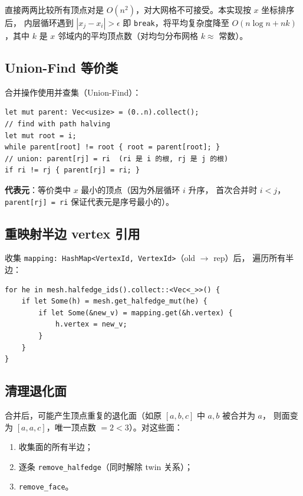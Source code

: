 \documentclass[11pt,a4paper]{article}
\begin{document}
直接两两比较所有顶点对是 $O(n^2)$，对大网格不可接受。本实现按 $x$ 坐标排序后，
内层循环遇到 $|x_j - x_i| > \epsilon$ 即 \texttt{break}，将平均复杂度降至
$O(n \log n + nk)$，其中 $k$ 是 $x$ 邻域内的平均顶点数（对均匀分布网格 $k \approx$ 常数）。

\subsection{Union-Find 等价类}

合并操作使用并查集（Union-Find）：

\begin{lstlisting}
let mut parent: Vec<usize> = (0..n).collect();
// find with path halving
let mut root = i;
while parent[root] != root { root = parent[root]; }
// union: parent[rj] = ri  (ri 是 i 的根, rj 是 j 的根)
if ri != rj { parent[rj] = ri; }
\end{lstlisting}

\textbf{代表元}：等价类中 $x$ 最小的顶点（因为外层循环 $i$ 升序，
首次合并时 $i < j$，\texttt{parent[rj] = ri} 保证代表元是序号最小的）。

\subsection{重映射半边 vertex 引用}

收集 \texttt{mapping: HashMap<VertexId, VertexId>}（old $\to$ rep）后，
遍历所有半边：

\begin{lstlisting}
for he in mesh.halfedge_ids().collect::<Vec<_>>() {
    if let Some(h) = mesh.get_halfedge_mut(he) {
        if let Some(&new_v) = mapping.get(&h.vertex) {
            h.vertex = new_v;
        }
    }
}
\end{lstlisting}

\subsection{清理退化面}

合并后，可能产生顶点重复的退化面（如原 $[a, b, c]$ 中 $a, b$ 被合并为 $a$，
则面变为 $[a, a, c]$，唯一顶点数 $= 2 < 3$）。对这些面：

\begin{enumerate}
  \item 收集面的所有半边；
  \item 逐条 \texttt{remove\_halfedge}（同时解除 twin 关系）；
  \item \texttt{remove\_face}。
\end{enumerate}
\end{document}
